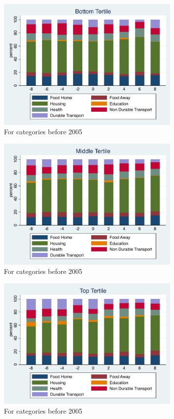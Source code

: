 \documentclass[11pt]{article}
\begin{document}
\begin{figure}[h]
	\caption{For categories before 2005}
	\centering
	\includegraphics[width=0.8\textwidth]{../ConsumptionPostRetirement/Tertile_Bar/tertile1.pdf}
\end{figure}

\begin{figure}[h]
	\caption{For categories before 2005}
	\centering
	\includegraphics[width=0.8\textwidth]{../ConsumptionPostRetirement/Tertile_Bar/tertile2.pdf}
\end{figure}

\begin{figure}[h]
	\caption{For categories before 2005}
	\centering
	\includegraphics[width=0.8\textwidth]{../ConsumptionPostRetirement/Tertile_Bar/tertile3.pdf}
\end{figure}
\end{document}
